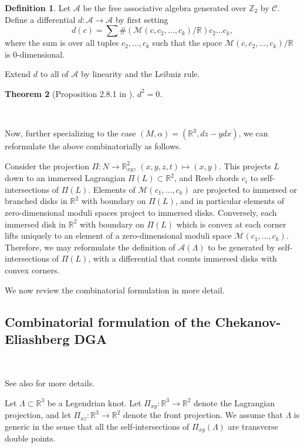 \documentclass[a4paper,final, reqno]{amsart}
\theoremstyle{plain}
\newtheorem{Th}{Theorem}[section]
\theoremstyle{definition}
\newtheorem{Def}[Th]{Definition}
\newcommand{\A}{\mathcal{A}}
\newcommand{\C}{\mathcal{C}}
\newcommand{\M}{\mathcal{M}}
\begin{document}
	
	\begin{Def}
		Let $\A$ be the free associative algebra generated over $\mathbb{Z}_2$ by $\C$. Define a differential $d:\A\to \A$ by first setting
		\[ d(c) = \sum \# \left( \M(c, c_2, \dots, c_k)/\mathbb{R} \right) c_2\dots c_k, \]
		where the sum is over all tuples $c_2, \dots, c_k$ such that the space $\M(c, c_2,\dots, c_k)/\mathbb{R}$ is 0-dimensional.
		
		Extend $d$ to all of $\A$ by linearity and the Leibniz rule. 
	\end{Def}
	
	\begin{Th}[Proposition 2.8.1 in \cite{egh}]
		$d^2=0$.
	\end{Th}
	
	\-\
	
	
	Now, further specializing to the case $(M,\alpha) = (\mathbb{R}^3, dz-ydx)$, we can reformulate the above combinatorially as follows.
	
	Consider the projection $\Pi: N \to \mathbb{R}^2_{xy}$, $(x,y,z,t) \mapsto (x,y)$. This projects $L$ down to an immersed Lagrangian $\Pi(L) \subset \mathbb{R}^2$, and Reeb chords $c_i$ to self-intersections of $\Pi(L)$. Elements of $\M(c_1,\dots, c_k)$ are projected to immersed or branched disks in $\mathbb{R}^2$ with boundary on $\Pi(L)$, and in particular elements of zero-dimensional moduli spaces project to immersed disks. Conversely, each immersed disk in $\mathbb{R}^2$ with boundary on $\Pi(L)$ which is convex at each corner lifts uniquely to an element of a zero-dimensional moduli space $\M(c_1,\dots, c_k)$. Therefore, we may reformulate the definition of $\A(\Lambda)$ to be generated by self-intersections of $\Pi(L)$, with a differential that counts immersed disks with convex corners.
	
	
	We now review the combinatorial formulation in more detail.
	
	
	\subsection{Combinatorial formulation of the Chekanov-Eliashberg DGA}
	
	\-\
	
	See also \cite{ngetn} for more details.
	
	Let $\Lambda \subset \mathbb{R}^3$ be a Legendrian knot. Let $\Pi_{xy}: \mathbb{R}^3 \to \mathbb{R}^2$ denote the Lagrangian projection, and let $\Pi_{xz}: \mathbb{R}^3 \to \mathbb{R}^2$ denote the front projection. We assume that $\Lambda$ is generic in the sense that all the self-intersections of $\Pi_{xy}(\Lambda)$ are transverse double points. %
	
\end{document}
